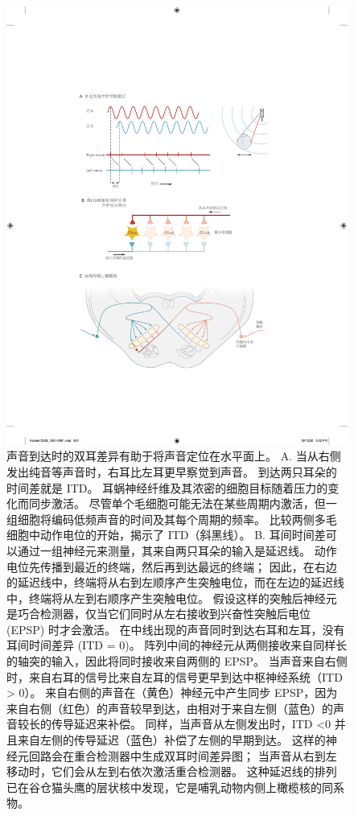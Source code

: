\begin{figure}[htbp]
	\centering
	\includegraphics[width=0.7\linewidth]{chap28/fig_28_5}
	\caption{声音到达时的双耳差异有助于将声音定位在水平面上。
		A. 当从右侧发出纯音等声音时，右耳比左耳更早察觉到声音。 
		到达两只耳朵的时间差就是 ITD。 
		耳蜗神经纤维及其浓密的细胞目标随着压力的变化而同步激活。
		尽管单个毛细胞可能无法在某些周期内激活，但一组细胞将编码低频声音的时间及其每个周期的频率。 
		比较两侧多毛细胞中动作电位的开始，揭示了 ITD（斜黑线）。 
		B. 耳间时间差可以通过一组神经元来测量，其来自两只耳朵的输入是延迟线\cite{jeffress1948place}。
		动作电位先传播到最近的终端，然后再到达最远的终端；
		因此，在右边的延迟线中，终端将从右到左顺序产生突触电位，而在左边的延迟线中，终端将从左到右顺序产生突触电位。
		假设这样的突触后神经元是巧合检测器，仅当它们同时从左右接收到兴奋性突触后电位 (EPSP) 时才会激活。
		在中线出现的声音同时到达右耳和左耳，没有耳间时间差异 (ITD = 0)。
		阵列中间的神经元从两侧接收来自同样长的轴突的输入，因此将同时接收来自两侧的 EPSP。
		当声音来自右侧时，来自右耳的信号比来自左耳的信号更早到达中枢神经系统（ITD > 0）。
		来自右侧的声音在（黄色）神经元中产生同步 EPSP，因为来自右侧（红色）的声音较早到达，由相对于来自左侧（蓝色）的声音较长的传导延迟来补偿。
		同样，当声音从左侧发出时，ITD <0 并且来自左侧的传导延迟（蓝色）补偿了左侧的早期到达。
		这样的神经元回路会在重合检测器中生成双耳时间差异图； 当声音从右到左移动时，它们会从左到右依次激活重合检测器。
		这种延迟线的排列已在谷仓猫头鹰的层状核中发现，它是哺乳动物内侧上橄榄核的同系物。
}
\end{figure}
